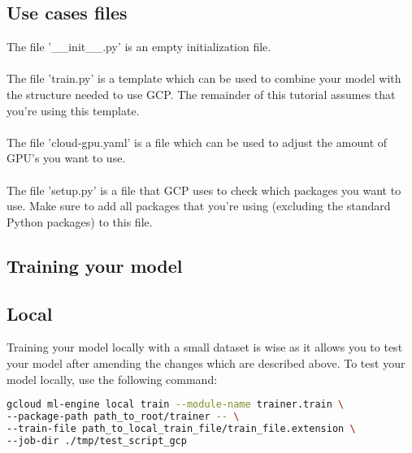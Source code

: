 \documentclass{article}
\begin{document}
\subsection{Use cases files}
The file '\_\_init\_\_.py' is an empty initialization file.
\\
\\
The file 'train.py' is a template which can be used to combine your model with the structure needed to use GCP. The remainder of this tutorial assumes that you're using this template.
\\
\\
The file 'cloud-gpu.yaml' is a file which can be used to adjust the amount of GPU's you want to use. 
\\
\\
The file 'setup.py' is a file that GCP uses to check which packages you want to use. Make sure to add all packages that you're using (excluding the standard Python packages) to this file.

\subsection{Training your model}
\subsection{Local}
Training your model locally with a small dataset is wise as it allows you to test your model after amending the changes which are described above. To test your model locally, use the following command:

\begin{lstlisting}[language=Bash]
gcloud ml-engine local train --module-name trainer.train \ 
--package-path path_to_root/trainer -- \
--train-file path_to_local_train_file/train_file.extension \
--job-dir ./tmp/test_script_gcp
\end{lstlisting}
\end{document}
